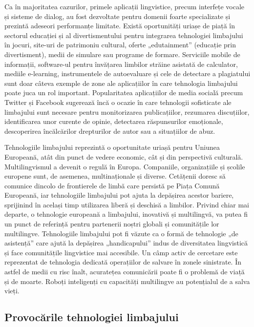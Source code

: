 \begin{multicols}{2}
Ca în majoritatea cazurilor, primele aplicații lingvistice, precum interfețe vocale și sisteme de dialog, au fost dezvoltate pentru domenii foarte specializate și prezintă adeseori performanțe limitate. Există oportunități uriașe de piață în sectorul educației și al divertismentului pentru integrarea tehnologiei limbajului în jocuri, site-uri de patrimoniu cultural, oferte „edutainment” (educație prin divertisment), medii de simulare sau programe de formare. Serviciile mobile de informații, software-ul pentru învățarea limbilor străine asistată de calculator, mediile e-learning, instrumentele de autoevaluare și cele de detectare a plagiatului sunt doar câteva exemple de zone ale aplicațiilor în care tehnologia limbajului poate juca un rol important. Popularitatea aplicațiilor de media socială precum Twitter și Facebook sugerează încă o ocazie în care tehnologii sofisticate ale limbajului sunt necesare pentru monitorizarea publicațiilor, rezumarea discuțiilor, identificarea unor curente de opinie, detectarea răspunsurilor emoționale, descoperirea încălcărilor drepturilor de autor sau a situațiilor de abuz.


Tehnologiile limbajului reprezintă o oportunitate uriașă pentru Uniunea Europeană, atât din punct de vedere economic, cât și din perspectivă culturală. Multilingvismul a devenit o regulă în Europa. Companiile, organizațiile și școlile europene sunt, de asemenea, multinaționale și diverse. Cetățenii doresc să comunice dincolo de frontierele de limbă care persistă pe Piața Comună Europeană, iar tehnologiile limbajului pot ajuta la depășirea acestor bariere, sprijinind în același timp utilizarea liberă și deschisă a limbilor. Privind chiar mai departe, o tehnologie europeană a limbajului, inovativă și multilingvă, va putea fi un punct de referință pentru partenerii noștri globali și comunitățile lor multilingve. Tehnologiile limbajului pot fi văzute ca o formă de tehnologie „de asistență” care ajută la depășirea „handicapului” indus de diversitatea lingvistică și face comunitățile lingvistice mai accesibile.
Un câmp activ de cercetare este reprezentat de tehnologia dedicată operațiilor de salvare în zonele sinistrate. În astfel de medii cu risc înalt, acuratețea comunicării poate fi o problemă de viață și de moarte. Roboți inteligenți cu capacități multilingve au potențialul de a salva vieți.

\subsection{Provocările tehnologiei limbajului}


\end{multicols}
